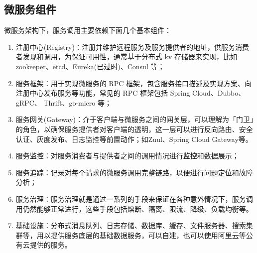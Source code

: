 \documentclass[../../../interview-questions.tex]{subfiles}
\begin{document}
\subsection{微服务组件}

微服务架构下，服务调用主要依赖下面几个基本组件：

\begin{enumerate}
    \item {注册中心(Registry)：注册并维护远程服务及服务提供者的地址，供服务消费者发现和调用，为保证可用性，通常基于分布式 kv 存储器来实现，比如 zookeeper、etcd、Eureka(已过时)、Consul 等；}
    \item {服务框架：用于实现微服务的 RPC 框架，包含服务接口描述及实现方案、向注册中心发布服务等功能，常见的 RPC 框架包括 Spring Cloud、Dubbo、gRPC、 Thrift、go-micro 等；}
    \item {服务网关(Gateway)：介于客户端与微服务之间的网关层，可以理解为「门卫」的角色，以确保服务提供者对客户端的透明，这一层可以进行反向路由、安全认证、灰度发布、日志监控等前置动作；}如Zuul、Spring Cloud Gateway等。
    \item {服务监控：对服务消费者与提供者之间的调用情况进行监控和数据展示；}
    \item {服务追踪：记录对每个请求的微服务调用完整链路，以便进行问题定位和故障分析；}
    \item {服务治理：服务治理就是通过一系列的手段来保证在各种意外情况下，服务调用仍然能够正常进行，这些手段包括熔断、隔离、限流、降级、负载均衡等。}
    \item {基础设施：分布式消息队列、日志存储、数据库、缓存、文件服务器、搜索集群等，用以提供服务底层的基础数据服务，可以自建，也可以使用阿里云等公有云提供的服务。}
\end{enumerate}
\end{document}

